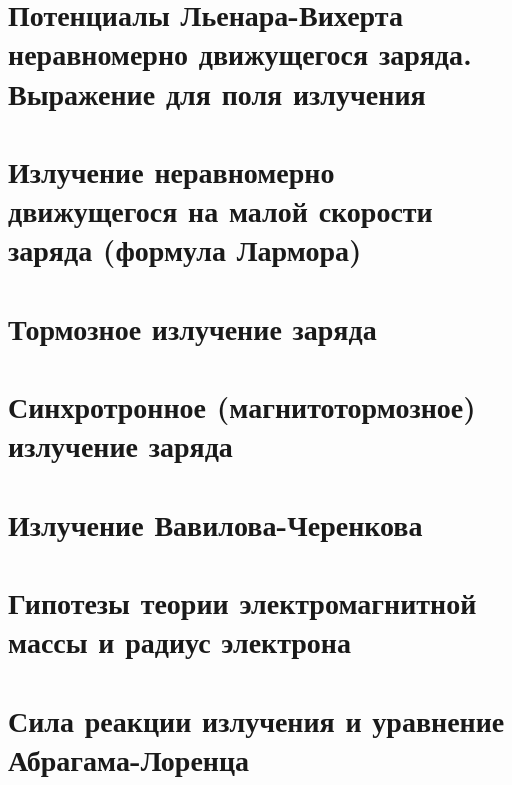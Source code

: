\begin{multicols*}{2}
		\section{Потенциалы Льенара-Вихерта неравномерно движущегося заряда. Выражение для поля излучения}
		\section{Излучение неравномерно движущегося на малой скорости заряда (формула Лармора)}
		\section{Тормозное излучение заряда}
		\section{Синхротронное (магнитотормозное) излучение заряда}
		\section{Излучение Вавилова-Черенкова}
		\section{Гипотезы теории электромагнитной массы и радиус электрона}
		\section{Сила реакции излучения и уравнение Абрагама-Лоренца}
	\end{multicols*}

